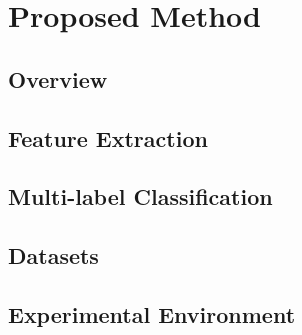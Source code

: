\chapter{Proposed Method}
\label{Methodology}

\section{Overview}
\label{Overview}

\section{Feature Extraction}
\label{FeatureExtraction}

\section{Multi-label Classification}
\label{MultiLabelClassification}

\section{Datasets}
\label{Datasets}

\section{Experimental Environment}
\label{ExperimentalEnvironment}
